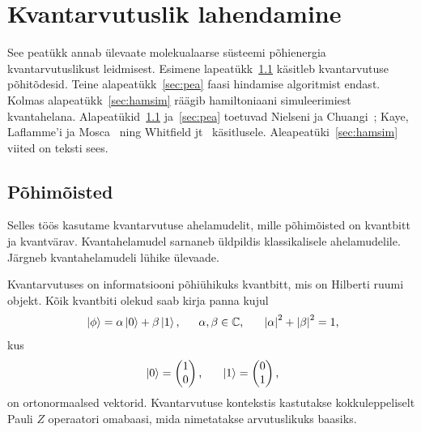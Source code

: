 \documentclass[12pt]{report}
\def\abs#1{\left|#1\right|}
\def\ket#1{\left|#1\right>}
\begin{document}
\chapter{Kvantarvutuslik lahendamine}\label{chap:qcomp}

See peatükk annab ülevaate molekualaarse süsteemi põhienergia kvantarvutuslikust leidmisest.
Esimene lapeatükk~\ref{sec:terms} käsitleb kvantarvutuse põhitõdesid.
Teine alapeatükk~\ref{sec:pea} faasi hindamise algoritmist endast.
Kolmas alapeatükk~\ref{sec:hamsim} räägib hamiltoniaani simuleerimiest kvantahelana.
Alapeatükid~\ref{sec:terms} ja~\ref{sec:pea} toetuvad Nielseni ja Chuangi~\cite{nielsen+chuang}; Kaye, Laflamme'i ja Mosca~\cite{kaye+laflamme+mosca} ning Whitfield jt~\cite{whitfield+etal2011} käsitlusele.
Aleapeatüki~\ref{sec:hamsim} viited on teksti sees.

\section{Põhimõisted}\label{sec:terms}

Selles töös kasutame kvantarvutuse ahelamudelit, mille põhimõisted on kvantbitt ja kvantvärav.
Kvantahelamudel sarnaneb üldpildis klassikalisele ahelamudelile.
Järgneb kvantahelamudeli lühike ülevaade.

Kvantarvutuses on informatsiooni põhiühikuks kvantbitt, mis on Hilberti ruumi objekt.
Kõik kvantbiti olekud saab kirja panna kujul
\begin{align}
    \ket{\phi} = \alpha \ket{0} + \beta \ket{1} \rlap{,}
    \qquad \alpha, \beta \in \mathbb{C} \rlap{,}
    \qquad \abs{\alpha}^2 + \abs{\beta}^2 = 1 \rlap{,}
\end{align}
kus
\begin{align}\label{eq:compbasis}
    \ket{0} = \begin{pmatrix}
        1 \\
        0 \\
    \end{pmatrix} \rlap{,}
    \qquad
    \ket{1} = \begin{pmatrix}
        0 \\
        1 \\
    \end{pmatrix} \rlap{,}
\end{align}
on ortonormaalsed vektorid.
Kvantarvutuse kontekstis kastutakse kokkuleppeliselt Pauli \(Z\) operaatori omabaasi, mida nimetatakse arvutuslikuks baasiks.
\end{document}
